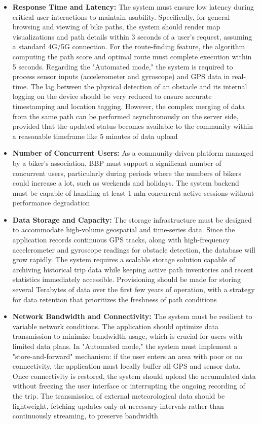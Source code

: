 \begin{itemize}
    \item \textbf{Response Time and Latency:}  The system must ensure low latency during critical user interactions to maintain usability. Specifically, for general browsing and viewing of bike paths, the system should render map visualizations and path details within 3 seconds of a user's request, assuming a standard 4G/5G connection. For the route-finding feature, the algorithm computing the path score and optimal route must complete execution within 5 seconds. Regarding the "Automated mode," the system is required to process sensor inputs (accelerometer and gyroscope) and GPS data in real-time. The lag between the physical detection of an obstacle and its internal logging on the device should be very reduced to ensure accurate timestamping and location tagging. However, the complex merging of data from the same path can be performed asynchronously on the server side, provided that the updated status becomes available to the community within a reasonable timeframe like 5 minutes of data upload
    \item \textbf{Number of Concurrent Users:} As a community-driven platform managed by a biker's association, BBP must support a significant number of concurrent users, particularly during periods where the numbers of bikers could increase a lot, such as weekends and holidays. The system backend must be capable of handling at least 1 mln concurrent active sessions without performance degradation
    \item \textbf{Data Storage and Capacity:} The storage infrastructure must be designed to accommodate high-volume geospatial and time-series data. Since the application records continuous GPS tracks, along with high-frequency accelerometer and gyroscope readings for obstacle detection, the database will grow rapidly. The system requires a scalable storage solution capable of archiving historical trip data while keeping active path inventories and recent statistics immediately accessible. Provisioning should be made for storing several Terabytes of data over the first few years of operation, with a strategy for data retention that prioritizes the freshness of path conditions
    \item \textbf{Network Bandwidth and Connectivity:} The system must be resilient to variable network conditions. The application should optimize data transmission to minimize bandwidth usage, which is crucial for users with limited data plans. In "Automated mode," the system must implement a "store-and-forward" mechanism: if the user enters an area with poor or no connectivity, the application must locally buffer all GPS and sensor data. Once connectivity is restored, the system should upload the accumulated data without freezing the user interface or interrupting the ongoing recording of the trip. The transmission of external meteorological data should be lightweight, fetching updates only at necessary intervals rather than continuously streaming, to preserve bandwidth

\end{itemize}
